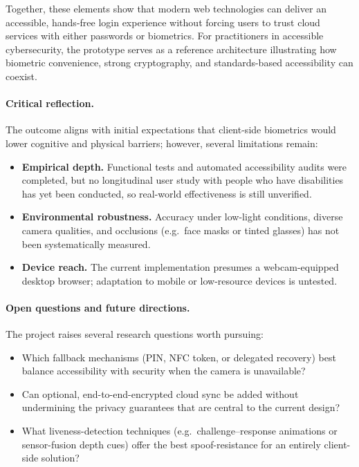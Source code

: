 Together, these elements show that modern web technologies can deliver an accessible, hands-free login experience without forcing users to trust cloud services with either passwords or biometrics. For practitioners in accessible cybersecurity, the prototype serves as a reference architecture illustrating how biometric convenience, strong cryptography, and standards-based accessibility can coexist.

\paragraph{Critical reflection.}
The outcome aligns with initial expectations that client-side biometrics would lower cognitive and physical barriers; however, several limitations remain:

\begin{itemize}
\item \textbf{Empirical depth.} Functional tests and automated accessibility audits were completed, but no longitudinal user study with people who have disabilities has yet been conducted, so real-world effectiveness is still unverified.
\item \textbf{Environmental robustness.} Accuracy under low-light conditions, diverse camera qualities, and occlusions (e.g.\ face masks or tinted glasses) has not been systematically measured.
\item \textbf{Device reach.} The current implementation presumes a webcam-equipped desktop browser; adaptation to mobile or low-resource devices is untested.
\end{itemize}

\paragraph{Open questions and future directions.}
The project raises several research questions worth pursuing:

\begin{itemize}
\item Which fallback mechanisms (PIN, NFC token, or delegated recovery) best balance accessibility with security when the camera is unavailable?
\item Can optional, end-to-end-encrypted cloud sync be added without undermining the privacy guarantees that are central to the current design?
\item What liveness-detection techniques (e.g.\ challenge–response animations or sensor-fusion depth cues) offer the best spoof-resistance for an entirely client-side solution?
\end{itemize}

